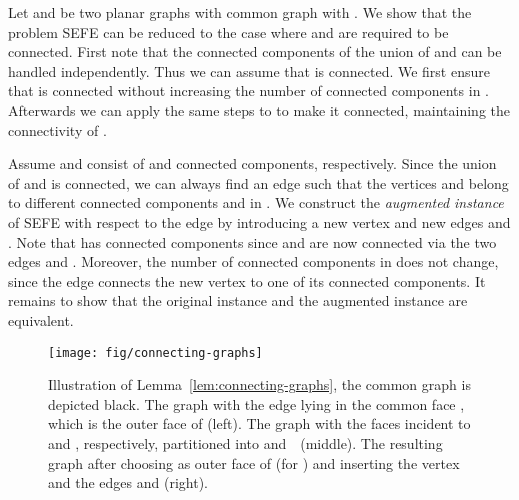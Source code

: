 \documentclass{scrartcl}
\newcommand{\1}[1]{{\normalfont \ensuremath{#1^{\tiny\circled{1}}}}} \newcommand{\2}[1]{{\normalfont \ensuremath{#1^{\tiny\circled{2}}}}} \renewcommand{\k}[1]{{\normalfont \ensuremath{#1^{\tiny\circled{k}}}}} \newcommand{\proj}[2]{\ensuremath{\left.#1\right|_{#2}}} \newcommand{\eps}{\varepsilon}
\theoremstyle{plain} \newtheorem{theorem}{Theorem} \newcounter{lemmacounter} \setcounter{lemmacounter}{0} \newtheorem{lemma}[lemmacounter]{Lemma} \newtheorem{fact}{Fact}  \newtheorem{corollary}{Corollary} \theoremstyle{definition} \newtheorem{definition}{Definition}
\begin{document}
Let  and  be two planar graphs with
common graph  with .  We show that the
problem {\sc SEFE} can be reduced to the case where  and 
are required to be connected.  First note that the connected
components of the union of  and  can be handled
independently.  Thus we can assume that  is connected.
We first ensure that  is connected without increasing the number
of connected components in .  Afterwards we can apply the same
steps to  to make it connected, maintaining the connectivity of
.

Assume  and  consist of  and  connected
components, respectively.  Since the union of  and  is
connected, we can always find an edge  such
that the vertices  and  belong to different connected
components  and  in .  We construct the
\emph{augmented instance}  of {\sc SEFE} with
respect to the edge  by introducing a new vertex  and new
edges  and .
Note that  has  connected components since 
and  are now connected via the two edges  and .
Moreover, the number  of connected components in  does not
change, since the edge  connects the new vertex  to one of
its connected components.  It remains to show that the original
instance and the augmented instance are equivalent.

\begin{figure}
  \centering
  \texttt{[image: fig/connecting-graphs]}
  \caption{Illustration of Lemma~\ref{lem:connecting-graphs}, the
    common graph is depicted black.  The graph  with the edge
     lying in the common face , which is the
    outer face of  (left).  The graph  with the faces
     incident to  and
    , respectively, partitioned into 
    and~~(middle). The resulting graph  after choosing
     as outer face of  (for ) and inserting
    the vertex  and the edges  and  (right).}
  \label{fig:connecting-graphs}
\end{figure}
\end{document}
